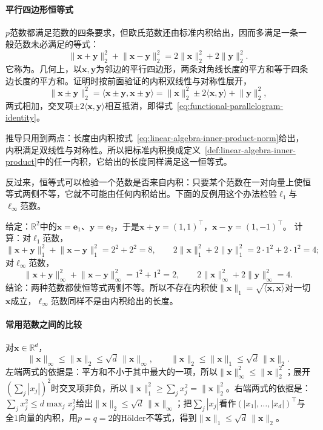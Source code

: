 \paragraph{平行四边形恒等式}
$p$范数都满足范数的四条要求，但欧氏范数还由标准内积给出，因而多满足一条一般范数未必满足的等式：
\begin{equation}
 \lVert\bm x+\bm y\rVert_2^2+\lVert\bm x-\bm y\rVert_2^2
 =2\lVert\bm x\rVert_2^2+2\lVert\bm y\rVert_2^2.
 \label{eq:functional-parallelogram-identity}
\end{equation}
它称为。几何上，以$\bm x,\bm y$为邻边的平行四边形，两条对角线长度的平方和等于四条边长度的平方和。证明时按前面验证的内积双线性与对称性展开，
\[
 \lVert\bm x\pm\bm y\rVert_2^2=\langle\bm x\pm\bm y,\bm x\pm\bm y\rangle=\lVert\bm x\rVert_2^2\pm2\langle\bm x,\bm y\rangle+\lVert\bm y\rVert_2^2,
\]
两式相加，交叉项$\pm2\langle\bm x,\bm y\rangle$相互抵消，即得式~\eqref{eq:functional-parallelogram-identity}。

推导只用到两点：长度由内积按式~\eqref{eq:linear-algebra-inner-product-norm}给出，内积满足双线性与对称性。所以把标准内积换成定义~\ref{def:linear-algebra-inner-product}中的任一内积，它给出的长度同样满足这一恒等式。

反过来，恒等式可以检验一个范数是否来自内积：只要某个范数在一对向量上使恒等式两侧不等，它就不可能由任何内积给出。下面的反例用这个办法检验$\ell_1$与$\ell_\infty$范数。
\begin{example}
\label{ex:ls-l1-linf-not-inner-product}
给定：$\mathbb R^2$中的$\bm x=\bm e_1$、$\bm y=\bm e_2$，于是$\bm x+\bm y=(1,1)^\top$，$\bm x-\bm y=(1,-1)^\top$。
计算：对$\ell_1$范数，
\[
 \lVert\bm x+\bm y\rVert_1^2+\lVert\bm x-\bm y\rVert_1^2=2^2+2^2=8,\qquad
 2\lVert\bm x\rVert_1^2+2\lVert\bm y\rVert_1^2=2\cdot1^2+2\cdot1^2=4;
\]
对$\ell_\infty$范数，
\[
 \lVert\bm x+\bm y\rVert_\infty^2+\lVert\bm x-\bm y\rVert_\infty^2=1^2+1^2=2,\qquad
 2\lVert\bm x\rVert_\infty^2+2\lVert\bm y\rVert_\infty^2=4.
\]
结论：两种范数都使恒等式两侧不等。所以不存在内积使$\lVert\bm x\rVert_1=\sqrt{\langle\bm x,\bm x\rangle}$对一切$\bm x$成立，$\ell_\infty$范数同样不是由内积给出的长度。
\end{example}

\paragraph{常用范数之间的比较}
对$\bm x\in\mathbb R^d$，
\[
 \lVert\bm x\rVert_\infty\leq\lVert\bm x\rVert_2\leq\sqrt d\,\lVert\bm x\rVert_\infty,
 \qquad
 \lVert\bm x\rVert_2\leq\lVert\bm x\rVert_1\leq\sqrt d\,\lVert\bm x\rVert_2.
\]
左端两式的依据是：平方和不小于其中最大的一项，所以$\lVert\bm x\rVert_\infty^2\leq\lVert\bm x\rVert_2^2$；展开$(\sum_j|x_j|)^2$时交叉项非负，所以$\lVert\bm x\rVert_1^2\geq\sum_jx_j^2=\lVert\bm x\rVert_2^2$。右端两式的依据是：$\sum_jx_j^2\leq d\max_jx_j^2$给出$\lVert\bm x\rVert_2\leq\sqrt d\,\lVert\bm x\rVert_\infty$；把$\sum_j|x_j|$看作$(|x_1|,\ldots,|x_d|)^\top$与全$1$向量的内积，用$p=q=2$的Hölder不等式，得到$\lVert\bm x\rVert_1\leq\sqrt d\,\lVert\bm x\rVert_2$。

